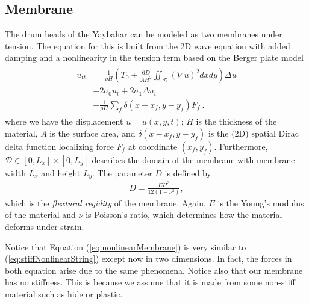 \documentclass{article}
\begin{document}
\subsection{Membrane}
\label{sec:membrane}
The drum heads of the Yaybahar can be modeled as two membranes under tension.
The equation for this is built from the 2D wave equation with added damping and a nonlinearity in the tension term based on the Berger plate model\cite[Chapter~11 and 13]{bilbao_numerical_2009}
\begin{align}
  \label{eq:nonlinearMembrane}
  \begin{split}
  u_{tt} &= \frac{1}{\rho H} \left(T_0 + \frac{6D}{A H^2} \iint_\mathcal{D} (\nabla u)^2 dxdy \right)\Delta u \\
  &- 2 \sigma_0 u_t + 2 \sigma_1 \Delta u_t \\
  &+ \frac{1}{\rho H}\sum_f \delta(x-x_f, y-y_f) F_f\ .
  \end{split}
\end{align}
where we have the displacement $u = u(x, y, t)$; $H$ is the thickness of the material, $A$ is the surface area, and $\delta(x-x_f,y-y_f)$ is the (2D) spatial Dirac delta function localizing force $F_f$ at coordinate $(x_f,y_f)$. Furthermore, $\mathcal{D} \in [0,L_x]\times[0,L_y]$ describes the domain of the membrane with membrane width $L_x$ and height $L_y$. The parameter $D$ is defined by
\begin{align}
  D = \frac{E H^3}{12 (1 - \nu^2)},
\end{align}
which is the \textit{flextural regidity} of the membrane. Again, $E$ is the Young's modulus of the material and $\nu$ is Poisson's ratio, which determines how the material deforms under strain.

Notice that Equation (\ref{eq:nonlinearMembrane}) is very similar to (\ref{eq:stiffNonlinearString}) except now in two dimensions.
In fact, the forces in both equation arise due to the same phenomena.
Notice also that our membrane has no stiffness.
This is because we assume that it is made from some non-stiff material such as hide or plastic.
\end{document}
